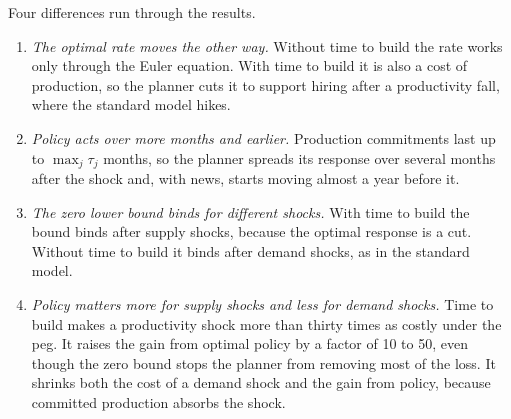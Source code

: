 \documentclass[11pt]{article}
\theoremstyle{definition}
\begin{document}
Four differences run through the results.
\begin{enumerate}
  \item \emph{The optimal rate moves the other way.} Without time to build the rate works only
        through the Euler equation. With time to build it is also a cost of production, so the planner
        cuts it to support hiring after a productivity fall, where the standard model hikes.
  \item \emph{Policy acts over more months and earlier.} Production commitments last up to
        $\max_j\tau_j$ months, so the planner spreads its response over several months after the
        shock and, with news, starts moving almost a year before it.
  \item \emph{The zero lower bound binds for different shocks.} With time to build the bound binds
        after supply shocks, because the optimal response is a cut. Without time to build it binds
        after demand shocks, as in the standard model.
  \item \emph{Policy matters more for supply shocks and less for demand shocks.} Time to build makes
        a productivity shock more than thirty times as costly under the peg. It raises the gain from
        optimal policy by a factor of 10 to 50, even though the zero bound stops the planner from
        removing most of the loss. It shrinks both the cost of a demand shock and the gain from policy,
        because committed production absorbs the shock.
\end{enumerate}
\end{document}

